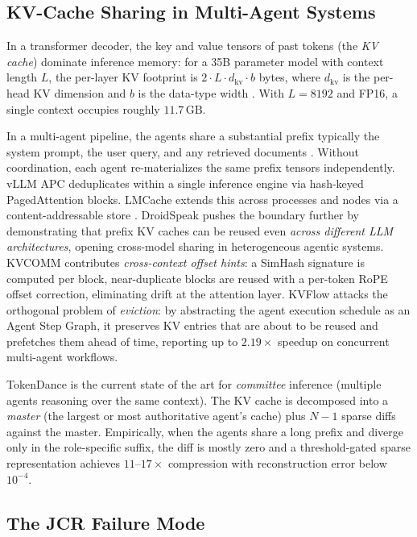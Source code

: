 \documentclass[10pt,twocolumn]{article}
\begin{document}
\subsection{KV-Cache Sharing in Multi-Agent Systems}
\label{sec:bg:kvshare}

In a transformer decoder, the key and value tensors of past tokens (the
\emph{KV cache}) dominate inference memory: for a 35B parameter model with
context length $L$, the per-layer KV footprint is
$2 \cdot L \cdot d_{\mathrm{kv}} \cdot b$ bytes, where $d_{\mathrm{kv}}$ is
the per-head KV dimension and $b$ is the data-type width
\cite{vllm,rotatekv}. With $L = 8192$ and FP16, a single context occupies
roughly $11.7\,\mathrm{GB}$.

In a multi-agent pipeline, the agents share a substantial prefix\textemdash
typically the system prompt, the user query, and any retrieved documents
\cite{kvcomm}. Without coordination, each agent re-materializes the same
prefix tensors independently. vLLM APC deduplicates within a single
inference engine via hash-keyed PagedAttention blocks. LMCache extends this
across processes and nodes via a content-addressable store
\cite{lmcache}. DroidSpeak \cite{droidspeak} pushes the boundary further by
demonstrating that prefix KV caches can be reused even \emph{across
different LLM architectures}, opening cross-model sharing in heterogeneous
agentic systems. KVCOMM \cite{kvcomm} contributes \emph{cross-context
offset hints}: a SimHash signature is computed per block, near-duplicate
blocks are reused with a per-token RoPE offset correction, eliminating
drift at the attention layer. KVFlow \cite{kvflow} attacks the orthogonal
problem of \emph{eviction}: by abstracting the agent execution schedule as
an Agent Step Graph, it preserves KV entries that are about to be reused
and prefetches them ahead of time, reporting up to $2.19\times$ speedup on
concurrent multi-agent workflows.

TokenDance \cite{tokendance} is the current state of the art for
\emph{committee} inference (multiple agents reasoning over the same
context). The KV cache is decomposed into a \emph{master} (the largest or
most authoritative agent's cache) plus $N-1$ sparse diffs against the
master. Empirically, when the agents share a long prefix and diverge only
in the role-specific suffix, the diff is mostly zero and a threshold-gated
sparse representation achieves $11$--$17\times$ compression with
reconstruction error below $10^{-4}$.

\subsection{The JCR Failure Mode}
\label{sec:bg:jcr}
\end{document}
